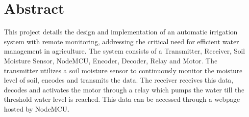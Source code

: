 \chapter*{Abstract}

This project details the design and implementation of an automatic irrigation system with remote monitoring, addressing the critical need for efficient water management in agriculture. The system consists of a Transmitter, Receiver, Soil Moisture Sensor, NodeMCU, Encoder, Decoder, Relay and Motor. The transmitter utilizes a soil moisture sensor to continuously monitor the moisture level of soil, encodes and transmits the data. The receiver receives this data, decodes and activates the motor through a relay which pumps the water till the threshold water level is reached. This data can be accessed through a webpage hosted by NodeMCU. 